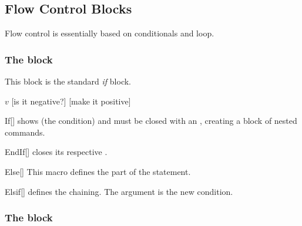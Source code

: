 \documentclass[a4paper, 11pt]{article}
\begin{document}
\subsection{Flow Control Blocks}\label{sec:flow-control-blocks}
Flow control is essentially based on conditionals and loop.

\subsubsection{The  block}
This block is the standard \textit{if} block.

\begin{tcblisting}{}
    \begin{algorithmic}
        \State \Read $v$
        [is it negative?]
            [make it positive]
        \EndIf
    \end{algorithmic}
\end{tcblisting}

\begin{macro}{If}[]
     shows  (the condition) and must be closed with an , creating a block of nested commands.

    \BlockOptionsText
\end{macro}

\begin{macro}{EndIf}[]
     closes its respective .

    \MacroOptionsText
\end{macro}

\begin{macro}{Else}[]
    This macro defines the  part of the  statement.

    \BlockOptionsText
\end{macro}

\begin{macro}{Elsif}[]
     defines the  chaining. The argument  is the new condition.

    \BlockOptionsText
\end{macro}

\subsubsection{The  block}
\end{document}
